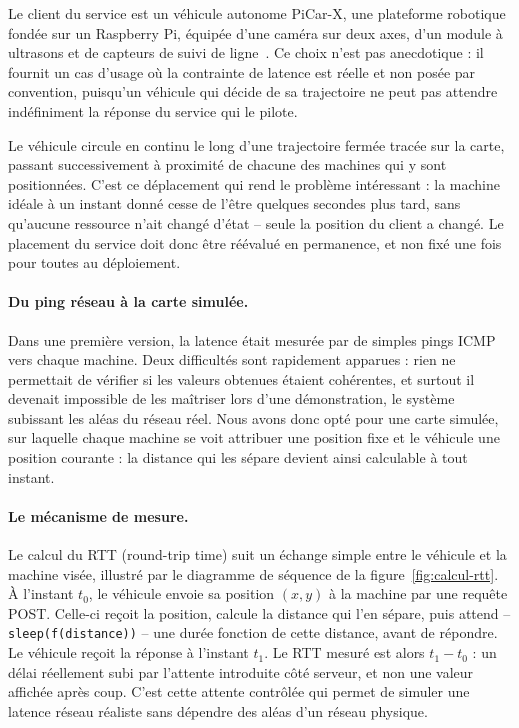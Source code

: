 Le client du service est un véhicule autonome PiCar-X, une plateforme robotique fondée sur un Raspberry Pi, équipée d'une caméra sur deux axes, d'un module à ultrasons et de capteurs de suivi de ligne~\cite{sunfounder_picarx}. Ce choix n'est pas anecdotique : il fournit un cas d'usage où la contrainte de latence est réelle et non posée par convention, puisqu'un véhicule qui décide de sa trajectoire ne peut pas attendre indéfiniment la réponse du service qui le pilote.

Le véhicule circule en continu le long d'une trajectoire fermée tracée sur la carte, passant successivement à proximité de chacune des machines qui y sont positionnées. C'est ce déplacement qui rend le problème intéressant : la machine idéale à un instant donné cesse de l'être quelques secondes plus tard, sans qu'aucune ressource n'ait changé d'état -- seule la position du client a changé. Le placement du service doit donc être réévalué en permanence, et non fixé une fois pour toutes au déploiement.

\paragraph{Du ping réseau à la carte simulée.} Dans une première version, la latence était mesurée par de simples pings ICMP vers chaque machine. Deux difficultés sont rapidement apparues : rien ne permettait de vérifier si les valeurs obtenues étaient cohérentes, et surtout il devenait impossible de les maîtriser lors d'une démonstration, le système subissant les aléas du réseau réel. Nous avons donc opté pour une carte simulée, sur laquelle chaque machine se voit attribuer une position fixe et le véhicule une position courante : la distance qui les sépare devient ainsi calculable à tout instant.

\paragraph{Le mécanisme de mesure.} Le calcul du RTT (round-trip time) suit un échange simple entre le véhicule et la machine visée, illustré par le diagramme de séquence de la figure~\ref{fig:calcul-rtt}. À l'instant $t_0$, le véhicule envoie sa position $(x,y)$ à la machine par une requête POST. Celle-ci reçoit la position, calcule la distance qui l'en sépare, puis attend -- \texttt{sleep(f(distance))} -- une durée fonction de cette distance, avant de répondre. Le véhicule reçoit la réponse à l'instant $t_1$. Le RTT mesuré est alors $t_1 - t_0$ : un délai réellement subi par l'attente introduite côté serveur, et non une valeur affichée après coup. C'est cette attente contrôlée qui permet de simuler une latence réseau réaliste sans dépendre des aléas d'un réseau physique.

